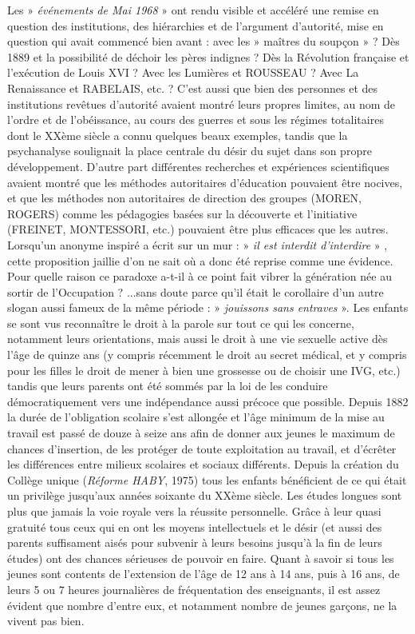  Les » \emph{événements de Mai 1968} » ont rendu visible et accéléré une remise en question des institutions, des hiérarchies et de l'argument d'autorité, mise en question qui avait commencé bien avant : avec les » maîtres du soupçon » ? Dès 1889 et la possibilité de déchoir les pères indignes ? Dès la Révolution française et l'exécution de Louis XVI ? Avec les Lumières et ROUSSEAU ? Avec La Renaissance et RABELAIS, etc. ? C'est aussi que bien des personnes et des institutions revêtues d'autorité avaient montré leurs propres limites, au nom de l'ordre et de l'obéissance, au cours des guerres et sous les régimes totalitaires dont le XXème siècle a connu quelques beaux exemples, tandis que la psychanalyse soulignait la place centrale du désir du sujet dans son propre développement. D'autre part différentes recherches et expériences scientifiques avaient montré que les méthodes autoritaires d'éducation pouvaient être nocives, et que les méthodes non autoritaires de direction des groupes (MOREN, ROGERS) comme les pédagogies basées sur la découverte et l'initiative (FREINET, MONTESSORI, etc.) pouvaient être plus efficaces que les autres.
 Lorsqu'un anonyme inspiré a écrit sur un mur : » \emph{il est interdit d'interdire} » , cette proposition jaillie d'on ne sait où a donc été reprise comme une évidence. Pour quelle raison ce paradoxe a-t-il à ce point fait vibrer la génération née au sortir de l'Occupation ? ...sans doute parce qu'il était le corollaire d'un autre slogan aussi fameux de la même période : » \emph{jouissons sans entraves} ». 
 Les enfants se sont vus reconnaître le droit à la parole sur tout ce qui les concerne, notamment leurs orientations, mais aussi le droit à une vie sexuelle active dès l'âge de quinze ans (y compris récemment le droit au secret médical, et y compris pour les filles le droit de mener à bien une grossesse ou de choisir une IVG, etc.) tandis que leurs parents ont été sommés par la loi de les conduire démocratiquement vers une indépendance aussi précoce que possible. 
 Depuis 1882 la durée de l'obligation scolaire s'est allongée et l'âge minimum de la mise au travail est passé de douze à seize ans afin de donner aux jeunes le maximum de chances d'insertion, de les protéger de toute exploitation au travail, et d'écrêter les différences entre milieux scolaires et sociaux différents. Depuis la création du Collège unique (\emph{Réforme HABY}, 1975) tous les enfants bénéficient de ce qui était un privilège jusqu'aux années soixante du XXème siècle. Les études longues sont plus que jamais la voie royale vers la réussite personnelle. Grâce à leur quasi gratuité tous ceux qui en ont les moyens intellectuels et le désir (et aussi des parents suffisament aisés pour subvenir à leurs besoins jusqu'à la fin de leurs études) ont des chances sérieuses de pouvoir en faire. Quant à savoir si tous les jeunes sont contents de l'extension de l'âge de 12 ans à 14 ans, puis à 16 ans, de leurs 5 ou 7 heures journalières de fréquentation des enseignants, il est assez évident que nombre d'entre eux, et notamment nombre de jeunes garçons, ne la vivent pas bien.
